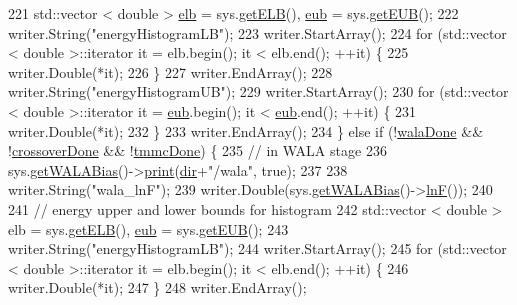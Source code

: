 \begin{DoxyCode}
221         std::vector < double > \hyperlink{classcheckpoint_a2338cb624f19eb6776c10f9bb83b2a5d}{elb} = sys.\hyperlink{classsim_system_a610cbb1c6059151e420dbd42dd9da714}{getELB}(), \hyperlink{classcheckpoint_a7071b01d0936873321d0a706e761b6ac}{eub} = sys.\hyperlink{classsim_system_ae87e0ac03cc11259cd3b44c780a90a06}{getEUB}();
222         writer.String(\textcolor{stringliteral}{"energyHistogramLB"});
223         writer.StartArray();
224         \textcolor{keywordflow}{for} (std::vector < double >::iterator it = elb.begin(); it < elb.end(); ++it) \{
225             writer.Double(*it);
226         \}
227         writer.EndArray();
228         writer.String(\textcolor{stringliteral}{"energyHistogramUB"});
229         writer.StartArray();
230         \textcolor{keywordflow}{for} (std::vector < double >::iterator it = \hyperlink{classcheckpoint_a7071b01d0936873321d0a706e761b6ac}{eub}.begin(); it < \hyperlink{classcheckpoint_a7071b01d0936873321d0a706e761b6ac}{eub}.end(); ++it) \{
231             writer.Double(*it);
232         \}
233         writer.EndArray();
234     \} \textcolor{keywordflow}{else} \textcolor{keywordflow}{if} (!\hyperlink{classcheckpoint_aab066479e2ca6656d0031dd46a2fc1a5}{walaDone} && !\hyperlink{classcheckpoint_a4f13612ea6d376bb327295bfce3a70c5}{crossoverDone} && !\hyperlink{classcheckpoint_acbe0c62aa82735741a9f396827966823}{tmmcDone}) \{
235         \textcolor{comment}{// in WALA stage}
236         sys.\hyperlink{classsim_system_a7cb5049de8b0988349e89e30e4000407}{getWALABias}()->\hyperlink{classwala_a65569289fac85d0da9c336e17c9d809a}{print}(\hyperlink{classcheckpoint_a0e0f999ee8e0b09541e9131baa8a591d}{dir}+\textcolor{stringliteral}{"/wala"}, \textcolor{keyword}{true});
237 
238         writer.String(\textcolor{stringliteral}{"wala\_lnF"});
239         writer.Double(sys.\hyperlink{classsim_system_a7cb5049de8b0988349e89e30e4000407}{getWALABias}()->\hyperlink{classwala_acb8e59580d97bc3c5b9b4ff45eb6bb9a}{lnF}());
240 
241         \textcolor{comment}{// energy upper and lower bounds for histogram}
242         std::vector < double > elb = sys.\hyperlink{classsim_system_a610cbb1c6059151e420dbd42dd9da714}{getELB}(), \hyperlink{classcheckpoint_a7071b01d0936873321d0a706e761b6ac}{eub} = sys.\hyperlink{classsim_system_ae87e0ac03cc11259cd3b44c780a90a06}{getEUB}();
243         writer.String(\textcolor{stringliteral}{"energyHistogramLB"});
244         writer.StartArray();
245         \textcolor{keywordflow}{for} (std::vector < double >::iterator it = elb.begin(); it < elb.end(); ++it) \{
246             writer.Double(*it);
247         \}
248         writer.EndArray();

\end{DoxyCode}
